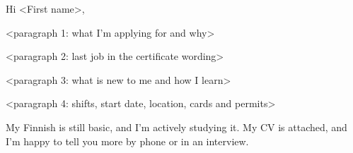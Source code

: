 \documentclass[a4paper,11pt]{article}
\begin{document}


\subject{Application: <Job Title>, <Company> <City>}

Hi <First name>,

<paragraph 1: what I'm applying for and why>

<paragraph 2: last job in the certificate wording>

<paragraph 3: what is new to me and how I learn>

<paragraph 4: shifts, start date, location, cards and permits>

My Finnish is still basic, and I'm actively studying it. My CV is attached, and I'm happy to tell you more by phone or in an interview.

\end{document}

